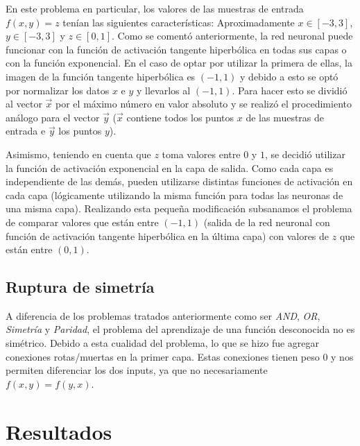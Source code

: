 \documentclass[%
    final,
    reprint,
    notitlepage,
    narroweqnarray,
    inline,
    twoside,
    invited
    ]{ieee}
\begin{document}
\par En este problema en particular, los valores de las muestras de entrada $f(x,y) = z$ tenían las siguientes características: Aproximadamente $x\in [-3,3]$, $y\in [-3,3]$ y $z\in [0,1]$. 
Como se comentó anteriormente, la red neuronal puede funcionar con la función de activación tangente hiperbólica en todas sus capas o con la función exponencial. En el caso de optar por utilizar la primera de ellas, la imagen de la función tangente hiperbólica es $(-1,1)$ y debido a esto se optó por normalizar los datos $x$ e $y$ y llevarlos al $(-1,1)$. Para hacer esto se dividió al vector  $\vec{x}$ por el máximo número en valor absoluto y se realizó el procedimiento análogo para el vector $\vec{y}$ ($\vec{x}$ contiene todos los puntos $x$ de las muestras de entrada e $\vec{y}$ los puntos $y$).\\
\par Asimismo, teniendo en cuenta que $z$ toma valores entre $0$ y $1$, se decidió utilizar la función de activación exponencial en la capa de salida. Como cada capa es independiente de las demás, pueden utilizarse distintas funciones de activación en cada capa (lógicamente utilizando la misma función para todas las neuronas de una misma capa). Realizando esta pequeña modificación subsanamos el problema de comparar valores que están entre $(-1,1)$ (salida de la red neuronal con función de activación tangente hiperbólica en la última capa) con valores de $z$ que están entre $(0,1)$.

\subsection{Ruptura de simetría}

\par A diferencia de los problemas tratados anteriormente como ser \textit{AND}, \textit{OR}, \textit{Simetría} y \textit{Paridad}, el problema del aprendizaje de una función desconocida no es simétrico. Debido a esta cualidad del problema, lo que se hizo fue agregar conexiones rotas/muertas en la primer capa. Estas conexiones tienen peso $0$ y nos permiten diferenciar los dos inputs, ya que no necesariamente $f(x, y) = f(y,x)$.


\section{Resultados}

\par 
\end{document}
